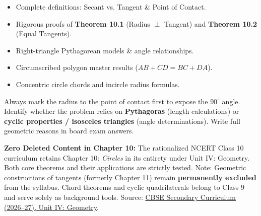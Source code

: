 \documentclass[10pt,a4paper]{article}
\begin{document}
\vspace{3.5mm}
\begin{minipage}[t]{0.48\textwidth}
  \begin{conceptBox}[title=What this handbook includes,fonttitle=\bfseries\color{navy}]
    \begin{itemize}
      \item Complete definitions: Secant vs. Tangent \& Point of Contact.
      \item Rigorous proofs of \textbf{Theorem 10.1} (Radius $\perp$ Tangent) and \textbf{Theorem 10.2} (Equal Tangents).
      \item Right-triangle Pythagorean models \& angle relationships.
      \item Circumscribed polygon master results ($AB+CD=BC+DA$).
      \item Concentric circle chords and incircle radius formulas.
    \end{itemize}
  \end{conceptBox}
\end{minipage}\hfill
\begin{minipage}[t]{0.48\textwidth}
  \begin{formulaBox}[title=How to use this handbook,fonttitle=\bfseries\color{navy}]
    \raggedright Always mark the radius to the point of contact first to expose the $90^\circ$ angle. Identify whether the problem relies on \textbf{Pythagoras} (length calculations) or \textbf{cyclic properties / isosceles triangles} (angle determinations). Write full geometric reasons in board exam answers.
  \end{formulaBox}
\end{minipage}

\vspace{1.5mm}
\begin{warningBox}[title=Official CBSE Curriculum Scope (Academic Year 2026--27),fonttitle=\bfseries\color{navy}]
  \textbf{Zero Deleted Content in Chapter 10:} The rationalized NCERT Class 10 curriculum retains Chapter 10: \textit{Circles} in its entirety under Unit IV: Geometry. Both core theorems and their applications are strictly tested. Note: Geometric constructions of tangents (formerly Chapter 11) remain \textbf{permanently excluded} from the syllabus. Chord theorems and cyclic quadrilaterals belong to Class 9 and serve solely as background tools.
  {\scriptsize Source: \href{https://cbseacademic.nic.in/web_material/CurriculumMain27/SecPart1/Maths_SecP1X_2026-27.pdf}{CBSE Secondary Curriculum (2026--27), Unit IV: Geometry}.}
\end{warningBox}
\end{document}
